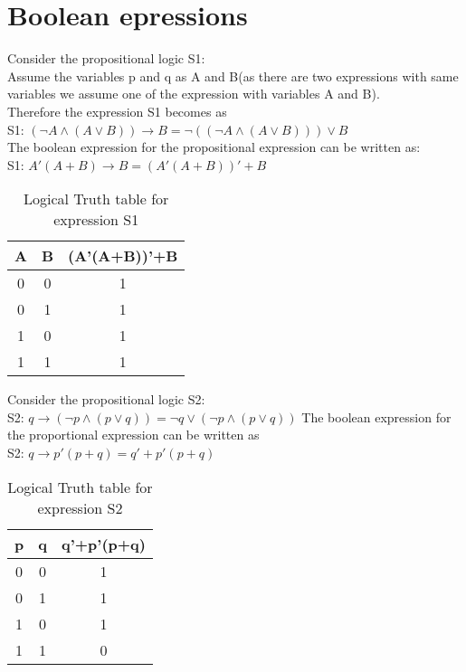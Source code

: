 \documentclass[journal,12pt,twocolumn]{IEEEtran}
\begin{document}
\section{Boolean epressions}
 Consider the propositional logic S1:\\
  Assume the variables p and q as A and B(as there are two expressions with same variables we assume one of the expression with variables A and B).\\
Therefore the expression S1 becomes as\\
S1: $(\neg{A} \land({A}\lor{B})) \longrightarrow B = \neg((\neg{A} \land({A}\lor{B})))\lor{B}$\\
The boolean expression for the propositional expression can be written as:\\
S1: $A'(A+B) \longrightarrow B = (A'(A+B))'+B$
\begin{table}[h]                                   
\centering                                      
\caption{Logical Truth table for expression S1} 
 \begin{tabular}{|c|c|c|}
 \hline
 A & B & (A'(A+B))'+B\\
 \hline
 0 & 0 & 1\\
 \hline
 0 & 1 & 1\\
 \hline
 1 & 0 & 1\\
 \hline
 1 & 1 & 1\\
 \hline
  \end{tabular}
\end{table}
Consider the propositional logic S2:\\
  S2: $q \longrightarrow (\neg{p}\land({p}\lor{q})) = \neg{q} \lor (\neg{p} \land ({p}\lor {q}))$
 The boolean expression for the proportional expression can be written as\\
 S2: $q \longrightarrow p'(p+q) = q'+p'(p+q)$
\begin{table}[h]                                   
\centering                                        
\caption{Logical Truth table for expression S2}
  \begin{tabular}{|c|c|c|}
	\hline
	p&q&q'+p'(p+q)\\
	\hline
	0 & 0 & 1\\
	\hline
	0 & 1 & 1\\
	\hline
	1 & 0 & 1\\
        \hline
        1 & 1 & 0\\
        \hline
  \end{tabular}
\end{table}
\end{document}
